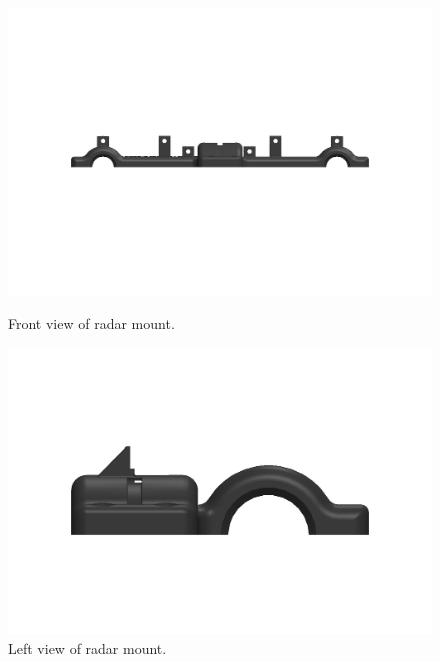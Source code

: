 \begin{figure}[H]
    \centering
    \begin{minipage}[b]{0.49\textwidth}
        \includegraphics[width=\textwidth]{Figures/CAD/upperRadarMountV2FrontView.PNG}
        \caption{Front view of radar mount.}
        \label{fig:upperRadarMountV2FrontView}
    \end{minipage}
    \begin{minipage}[b]{0.49\textwidth}
        \includegraphics[width=\textwidth]{Figures/CAD/upperRadarMountV2LeftView.PNG}
        \caption{Left view of radar mount.}
        \label{fig:upperRadarMountV2LeftView}
    \end{minipage}
\end{figure}

